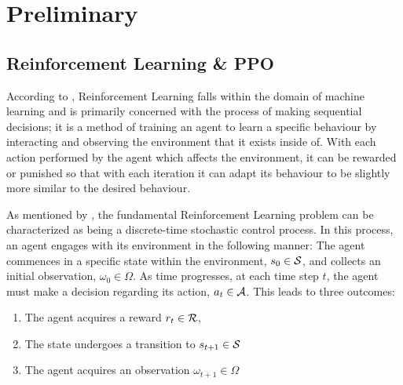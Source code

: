 \chapter{Preliminary}


\section{Reinforcement Learning \& PPO}

According to \cite{Fran_ois_Lavet_2018_rlintro}, Reinforcement Learning falls within the domain of machine learning and is primarily concerned with the process of making sequential decisions; it is a method of training an agent to learn a specific behaviour by interacting and observing the environment that it exists inside of. With each action performed by the agent which affects the environment, it can be rewarded or punished so that with each iteration it can adapt its behaviour to be slightly more similar to the desired behaviour. 


As mentioned by \cite{Fran_ois_Lavet_2018_rlintro}, the fundamental Reinforcement Learning problem can be characterized as being a discrete-time stochastic control process. In this process, an agent engages with its environment in the following manner: The agent commences in a specific state within the environment, $s_0 \in {\mathcal{S}}$, and collects an initial observation, $\omega_0 \in \Omega$. As time progresses, at each time step $t$, the agent must make a decision regarding its action, $a_t \in {\mathcal{A}}$. This leads to three outcomes:
\begin{enumerate}
    \item The agent acquires a reward $r_t \in {\mathcal{R}}$,
    \item The state undergoes a transition to $s_{t+1} \in {\mathcal{S}}$
    \item The agent acquires an observation $\omega_{t+1} \in \Omega$
\end{enumerate}

